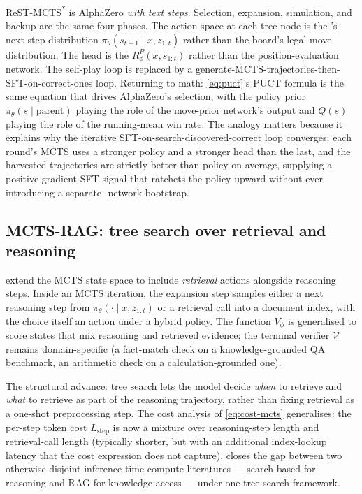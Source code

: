 \begin{analogy}
ReST-MCTS\textsuperscript{*} is AlphaZero \emph{with text steps}.
Selection, expansion, simulation, and backup are the same four phases.
The action space at each tree node is the 's next-step distribution
$\pi_\theta(s_{t+1} \mid x, z_{1:t})$ rather than the board's
legal-move distribution. The  head is the 
$R^P_\phi(x, s_{1:t})$ rather than the position-evaluation network.
The self-play loop is replaced by a
generate-MCTS-trajectories-then-SFT-on-correct-ones loop. Returning to
math: \cref{eq:puct}'s PUCT formula is the same equation that drives
AlphaZero's selection, with the policy prior
$\pi_\theta(s \mid \text{parent})$ playing the role of the
move-prior network's output and $Q(s)$ playing the role of the
running-mean win rate. The analogy matters because it
explains why the iterative SFT-on-search-discovered-correct loop
converges: each round's MCTS uses a stronger policy and a stronger
 head than the last, and the harvested trajectories are
strictly better-than-policy on average, supplying a positive-gradient
SFT signal that ratchets the policy upward without ever introducing
a separate -network bootstrap.
\end{analogy}

\subsection{MCTS-RAG: tree search over retrieval and reasoning}
\label{sec:tree-mcts-rag}

\citet{hu2025-mcts-rag} extend the MCTS state space to include
\emph{retrieval} actions alongside reasoning
steps. Inside an MCTS iteration, the
expansion step samples either a next reasoning step from
$\pi_\theta(\cdot \mid x, z_{1:t})$ or a retrieval call into a
document index, with the choice itself an action under a hybrid
policy. The  function $V_\phi$ is generalised to score states
that mix reasoning and retrieved evidence; the terminal verifier
$\mathcal{V}$ remains domain-specific (a fact-match check on a
knowledge-grounded QA benchmark, an arithmetic check on a
calculation-grounded one).

The structural advance: tree search lets the model decide
\emph{when} to retrieve and \emph{what} to retrieve as part of the
reasoning trajectory, rather than fixing retrieval as a one-shot
preprocessing step. The cost analysis of \cref{eq:cost-mcts}
generalises: the per-step token cost $L_\text{step}$ is now a mixture
over reasoning-step length and retrieval-call length (typically
shorter, but with an additional index-lookup latency that the cost
expression does not capture).  closes the gap between two
otherwise-disjoint inference-time-compute literatures --- search-based
 for reasoning and RAG for knowledge access --- under one
tree-search framework.

